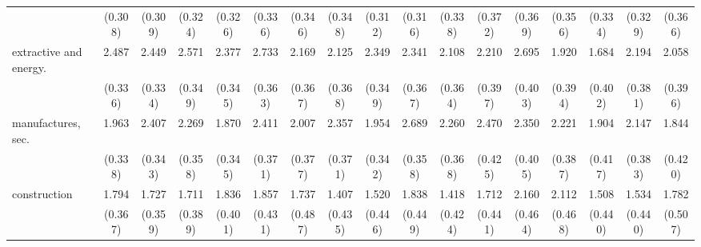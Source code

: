 {\begin{tabular}{l*{16}{c}}
                    &     (0.308)         &     (0.309)         &     (0.324)         &     (0.326)         &     (0.336)         &     (0.346)         &     (0.348)         &     (0.312)         &     (0.316)         &     (0.338)         &     (0.372)         &     (0.369)         &     (0.356)         &     (0.334)         &     (0.329)         &     (0.366)         \\
[1em]
extractive and energy.&       2.487\sym{***}&       2.449\sym{***}&       2.571\sym{***}&       2.377\sym{***}&       2.733\sym{***}&       2.169\sym{***}&       2.125\sym{***}&       2.349\sym{***}&       2.341\sym{***}&       2.108\sym{***}&       2.210\sym{***}&       2.695\sym{***}&       1.920\sym{***}&       1.684\sym{***}&       2.194\sym{***}&       2.058\sym{***}\\
                    &     (0.336)         &     (0.334)         &     (0.349)         &     (0.345)         &     (0.363)         &     (0.367)         &     (0.368)         &     (0.349)         &     (0.367)         &     (0.364)         &     (0.397)         &     (0.403)         &     (0.394)         &     (0.402)         &     (0.381)         &     (0.396)         \\
[1em]
manufactures, sec.  &       1.963\sym{***}&       2.407\sym{***}&       2.269\sym{***}&       1.870\sym{***}&       2.411\sym{***}&       2.007\sym{***}&       2.357\sym{***}&       1.954\sym{***}&       2.689\sym{***}&       2.260\sym{***}&       2.470\sym{***}&       2.350\sym{***}&       2.221\sym{***}&       1.904\sym{***}&       2.147\sym{***}&       1.844\sym{***}\\
                    &     (0.338)         &     (0.343)         &     (0.358)         &     (0.345)         &     (0.371)         &     (0.377)         &     (0.371)         &     (0.342)         &     (0.358)         &     (0.368)         &     (0.425)         &     (0.405)         &     (0.387)         &     (0.417)         &     (0.383)         &     (0.420)         \\
[1em]
construction        &       1.794\sym{***}&       1.727\sym{***}&       1.711\sym{***}&       1.836\sym{***}&       1.857\sym{***}&       1.737\sym{***}&       1.407\sym{**} &       1.520\sym{***}&       1.838\sym{***}&       1.418\sym{***}&       1.712\sym{***}&       2.160\sym{***}&       2.112\sym{***}&       1.508\sym{***}&       1.534\sym{***}&       1.782\sym{***}\\
                    &     (0.367)         &     (0.359)         &     (0.389)         &     (0.401)         &     (0.431)         &     (0.487)         &     (0.435)         &     (0.446)         &     (0.449)         &     (0.424)         &     (0.441)         &     (0.464)         &     (0.468)         &     (0.440)         &     (0.440)         &     (0.507)         \\

\end{tabular}}
